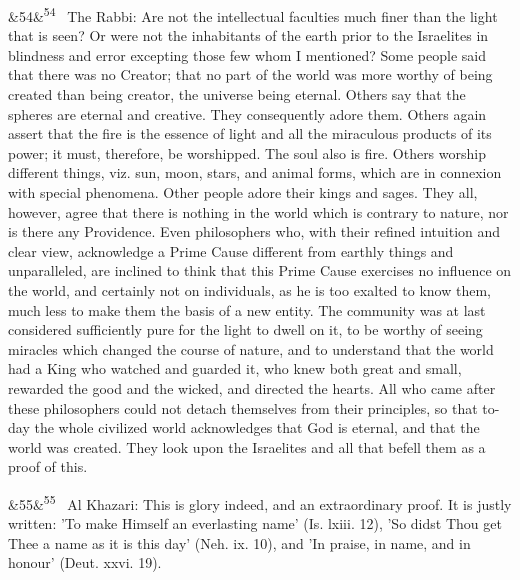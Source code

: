 \documentclass[12pt]{article}
\newcommand{\para}[1][]{\par\noindent\ifx&#1&\else\textsuperscript{\footnotesize #1}~\fi}
\begin{document}
\para[54] The Rabbi: Are not the intellectual faculties much finer than the light that is seen? Or were not the inhabitants of the earth prior to the Israelites in blindness and error excepting those few whom I mentioned? Some people said that there was no Creator; that no part of the world was more worthy of being created than being creator, the universe being eternal. Others say that the spheres are eternal and creative. They consequently adore them. Others again assert that the fire is the essence of light and all the miraculous products of its power; it must, therefore, be worshipped. The soul also is fire. Others worship different things, viz. sun, moon, stars, and animal forms, which are in connexion with special phenomena. Other people adore their kings and sages. They all, however, agree that there is nothing in the world which is contrary to nature, nor is there any Providence. Even philosophers who, with their refined intuition and clear view, acknowledge a Prime Cause different from earthly things and unparalleled, are inclined to think that this Prime Cause exercises no influence on the world, and certainly not on individuals, as he is too exalted to know them, much less to make them the basis of a new entity. The community was at last considered sufficiently pure for the light to dwell on it, to be worthy of seeing miracles which changed the course of nature, and to understand that the world had a King who watched and guarded it, who knew both great and small, rewarded the good and the wicked, and directed the hearts. All who came after these philosophers could not detach themselves from their principles, so that to-day the whole civilized world acknowledges that God is eternal, and that the world was created. They look upon the Israelites and all that befell them as a proof of this.

\para[55] Al Khazari: This is glory indeed, and an extraordinary proof. It is justly written: 'To make Himself an everlasting name' (Is. lxiii. 12), 'So didst Thou get Thee a name as it is this day' (Neh. ix. 10), and 'In praise, in name, and in honour' (Deut. xxvi. 19).
\end{document}
